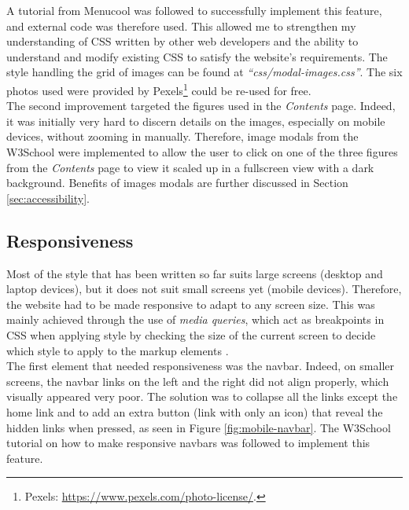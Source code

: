 \documentclass[letterpaper,12pt]{article}
\begin{document}
A tutorial from Menucool \cite{menucool} was followed to successfully implement this feature, and external code was therefore used. This allowed me to strengthen my understanding of CSS written by other web developers and the ability to understand and modify existing CSS to satisfy the website's requirements. The style handling the grid of images can be found at \textit{``css/modal-images.css''}. The six photos used were provided by Pexels\footnote{Pexels: \url{https://www.pexels.com/photo-license/}.} could be re-used for free.\\

The second improvement targeted the figures used in the \textit{Contents} page. Indeed, it was initially very hard to discern details on the images, especially on mobile devices, without zooming in manually. Therefore, image modals from the W3School \cite{w3s-image-modals} were implemented to allow the user to click on one of the three figures from the \textit{Contents} page to view it scaled up in a fullscreen view with a dark background. Benefits of images modals are further discussed in Section \ref{sec:accessibility}.

\subsection{Responsiveness}
\label{sec:responsiveness}

Most of the style that has been written so far suits large screens (desktop and laptop devices), but it does not suit small screens yet (mobile devices). Therefore, the website had to be made responsive to adapt to any screen size. This was mainly achieved through the use of \textit{media queries}, which act as breakpoints in CSS when applying style by checking the size of the current screen to decide which style to apply to the markup elements \cite{responsive-media-queries}.\\

The first element that needed responsiveness was the navbar. Indeed, on smaller screens, the navbar links on the left and the right did not align properly, which visually appeared very poor. The solution was to collapse all the links except the home link and to add an extra button (link with only an icon) that reveal the hidden links when pressed, as seen in Figure \ref{fig:mobile-navbar}. The W3School tutorial on how to make responsive navbars \cite{responsive-navbar} was followed to implement this feature.
\end{document}
